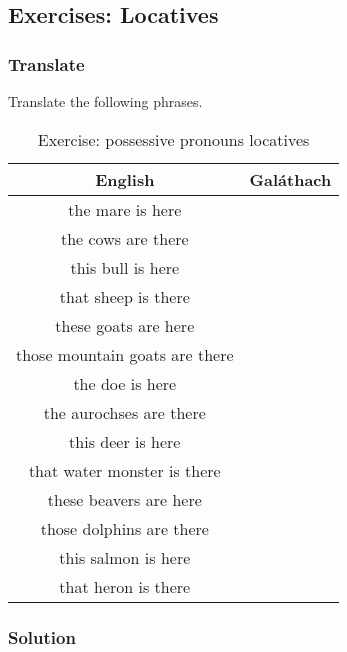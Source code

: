 \newpage
\subsection{Exercises: Locatives}

\subsubsection{Translate}

Translate the following phrases.
\begin{table}[H]
\centering
\begin{tabular}{|c|M{5.0cm}|}
  \toprule
  \textbf{English} & \textbf{Gal\'{a}thach}\\
  \toprule
  the mare is here & \\
  \midrule
  the cows are there & \\
  \midrule
  this bull is here & \\
  \midrule
  that sheep is there & \\
  \midrule
  these goats are here & \\
  \midrule
  those mountain goats are there & \\
  \midrule
  the doe is here & \\
  \midrule
  the aurochses are there & \\
  \midrule
  this deer is here & \\
  \midrule
  that water monster is there & \\
  \midrule
  these beavers are here & \\
  \midrule
  those dolphins are there & \\
  \midrule
  this salmon is here & \\
  \midrule
  that heron is there & \\
  \bottomrule
\end{tabular}
\label{exercise_possessive_pronouns_locatives}
\caption{Exercise: possessive pronouns locatives}
\end{table}

\newpage
\subsubsection{Solution}

